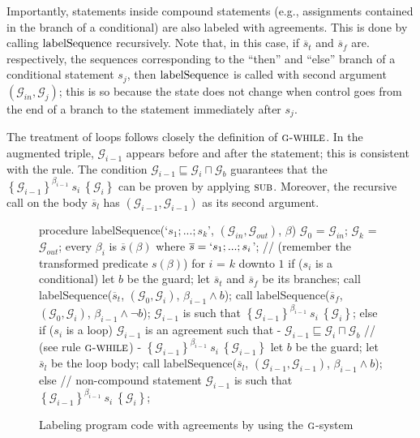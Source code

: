 \documentclass[prodmode,acmtocl]{acmsmall}
\newcommand{\0}{\mbox{\bf 0}}
\newcommand{\CODE}[1]{\ensuremath{\mbox{\lstinline!#1!}\xspace}\xspace}
\def\PRED{\beta}
\def\AGREEM{\mathcal{G}}
\newcommand{\RULENAME}[1]{\textsc{#1}}
\newcommand{\GRULENAME}[1]{\textsc{g-#1}}
\newcommand{\GSMTH}[1]{$\RULENAME{g}$-#1}
\def\GSYSTEM{\GSMTH{system}\xspace}
\newcommand{\TRIPLEB}[4]{\left\{#1\right\}^{#2}\ #3\ \left\{#4\right\}}
\begin{document}
Importantly, statements inside compound statements (e.g., assignments
contained in the branch of a conditional) are also labeled with
agreements.  This is done by calling \CODE{labelSequence} recursively.
Note that, in this case, if $\overline{s}_t$ and $\overline{s}_f$
are. respectively, the sequences corresponding to the ``then'' and
``else'' branch of a conditional statement $s_j$, then
\CODE{labelSequence} is called with second argument
$(\AGREEM_{in},\AGREEM_j)$; this is so because the state does not
change when control goes from the end of a branch to the statement
immediately after $s_j$.

The treatment of loops follows closely the definition of
$\GRULENAME{while}$.  In the augmented triple, $\AGREEM_{i-1}$ appears
before and after the statement; this is consistent with the rule.  The
condition $\AGREEM_{i-1} \sqsubseteq \AGREEM_i \sqcap \AGREEM_b$
guarantees that the
$\TRIPLEB{\AGREEM_{i-1}}{\PRED_{i-1}}{s_i}{\AGREEM_i}$ can be proven
by applying $\RULENAME{sub}$.  Moreover, the recursive call on the
body $\overline{s}_l$ has $(\AGREEM_{i-1},\AGREEM_{i-1})$ as its
second argument.

\begin{figure}
  \begin{pseudocode}
    procedure labelSequence(`$s_1;...;s_k$', $(\AGREEM_{in},\AGREEM_{out})$, $\PRED$) {
      $\AGREEM_0$ = $\AGREEM_{in}$;
      $\AGREEM_k$ = $\AGREEM_{out}$;
      every $\PRED_i$ is $\overline{s}(\PRED)$ where $\overline{s} = `s_1;...;s_i$';
      // (remember the transformed predicate $s(\PRED)$)
      for $i$ = $k$ downto $1$ {
        if ($s_i$ is a conditional) {
          let $b$ be the guard;
          let $\overline{s}_t$ and $\overline{s}_f$ be its branches;  
          call labelSequence($\overline{s}_t$, $(\AGREEM_0,\AGREEM_i)$, $\PRED_{i-1}\wedge b$);
          call labelSequence($\overline{s}_f$, $(\AGREEM_0,\AGREEM_i)$, $\PRED_{i-1}\wedge \lnot b$);
          $\AGREEM_{i-1}$ is such that $\TRIPLEB{\AGREEM_{i-1}}{\PRED_{i-1}}{s_i}{\AGREEM_i}$;
        } else if ($s_i$ is a loop) {
          $\AGREEM_{i-1}$ is an agreement such that
          - $\AGREEM_{i-1} \sqsubseteq \AGREEM_i \sqcap \AGREEM_b$ // (see rule $\GRULENAME{while}$)
          - $\TRIPLEB{\AGREEM_{i-1}}{\PRED_{i-1}}{s_i}{\AGREEM_{i-1}}$
          let $b$ be the guard;
          let $\overline{s}_l$ be the loop body;
          call labelSequence($\overline{s}_l$, $(\AGREEM_{i-1},\AGREEM_{i-1})$, $\PRED_{i-1}\wedge b$);
        } else { // non-compound statement
          $\AGREEM_{i-1}$ is such that $\TRIPLEB{\AGREEM_{i-1}}{\PRED_{i-1}}{s_i}{\AGREEM_i}$;
        }
      }
    }
  \end{pseudocode}
  \caption{Labeling program code with agreements by using the
    \GSYSTEM}
  \label{fig:agreementPropagation}
\end{figure}
  
\end{document}
